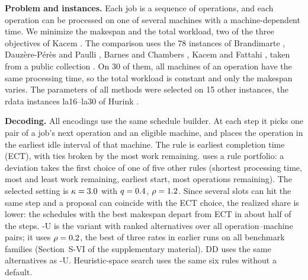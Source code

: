 \textbf{Problem and instances.}
Each job is a sequence of operations, and each operation can be processed on one of several machines with a machine-dependent time.
We minimize the makespan and the total workload, two of the three objectives of Kacem \etal \cite{kacem2002approach}.
The comparison uses the 78 instances of Brandimarte \cite{brandimarte1993routing}, Dauz\`ere-P\'er\`es and Paulli \cite{dauzere1997integrated}, Barnes and Chambers \cite{barnes1996flexible}, Kacem \etal \cite{kacem2002approach} and Fattahi \etal \cite{fattahi2007mathematical}, taken from a public collection \cite{schedulinglab2024fjsp}.
On 30 of them, all machines of an operation have the same processing time, so the total workload is constant and only the makespan varies.
The parameters of all methods were selected on 15 other instances, the rdata instances la16--la30 of Hurink \etal \cite{hurink1994tabu}.

\textbf{Decoding.}
All encodings use the same schedule builder.
At each step it picks one pair of a job's next operation and an eligible machine, and places the operation in the earliest idle interval of that machine.
The rule is earliest completion time (ECT), with ties broken by the most work remaining.
\RDD uses a rule portfolio: a deviation takes the first choice of one of five other rules (shortest processing time, most and least work remaining, earliest start, most operations remaining).
The selected setting is $\kappa = 3.0$ with $q = 0.4$, \ie $\rho = 1.2$.
Since several slots can hit the same step and a proposal can coincide with the ECT choice, the realized share is lower: the schedules with the best makespan depart from ECT in about half of the steps.
\RDD-U is the variant with ranked alternatives over all operation--machine pairs; it uses $\rho = 0.2$, the best of three rates in earlier runs on all benchmark families (Section~S-VI of the supplementary material).
DD uses the same alternatives as \RDD-U.
Heuristic-space search uses the same six rules without a default.

